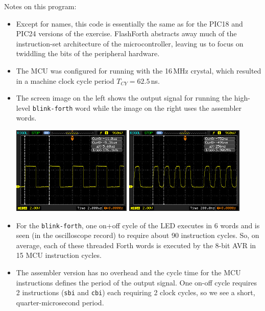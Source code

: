 \documentclass[12pt,a4paper]{article}
\begin{document}
\noindent
Notes on this program:
\begin{itemize}
 \item Except for names, this code is essentially the same as for the PIC18 and PIC24
  versions of the exercise.  FlashForth abstracts away much of the instruction-set architecture
  of the microcontroller, leaving us to focus on twiddling the bits of the peripheral hardware.
 \item The MCU was configured for running with the 16\,MHz crystal,
  which resulted in a machine clock cycle period $T_{CY} = 62.5$\,ns.
 \item The screen image on the left shows the output signal for running the high-level
  \verb!blink-forth! word while the image on the right uses the assembler words.
  \begin{center}
  \includegraphics[width=0.45\textwidth]{../figs/speed-test-forth-atmega328-2016.jpeg}
  \includegraphics[width=0.45\textwidth]{../figs/speed-test-asm-atmega328-2016.jpeg}
  \end{center}
 \item For the \verb!blink-forth!, one on+off cycle of the LED executes in 6 words
  and is seen (in the oscilloscope record) to require about 90 instruction cycles.
  So, on average, each of these threaded Forth words is executed by the 8-bit AVR in 15 MCU instruction cycles. 
 \item The assembler version has no overhead and the cycle time for the MCU
  instructions defines the period of the output signal.
  One on-off cycle requires 2 instructions (\verb!sbi! and \verb!cbi!) each requiring 2 clock cycles,
  so we see a short, quarter-microsecond period.

\end{itemize}
\end{document}
